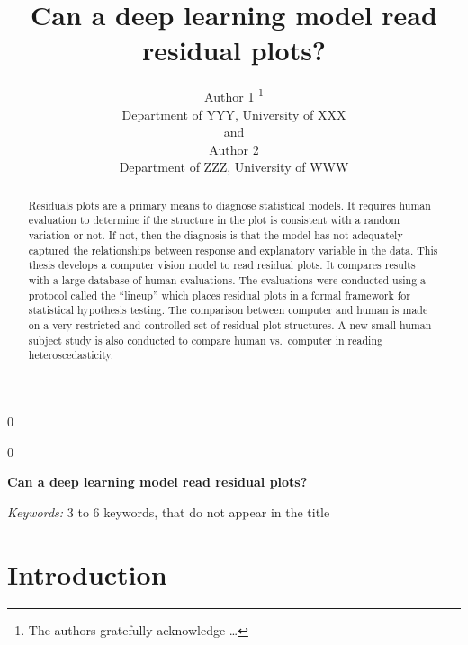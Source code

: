 \documentclass[12pt]{article}
\newcommand{\blind}{0}
\begin{document}
\def\spacingset#1{\renewcommand{\baselinestretch}%
{#1}\small\normalsize} \spacingset{1}



\blind
{
  \title{\bf Can a deep learning model read residual plots?}

  \author{
        Author 1 \thanks{The authors gratefully acknowledge \ldots{}} \\
    Department of YYY, University of XXX\\
     and \\     Author 2 \\
    Department of ZZZ, University of WWW\\
      }
  \maketitle
} \fi

\blind
{
  \bigskip
  \bigskip
  \bigskip
  \begin{center}
    {\LARGE\bf Can a deep learning model read residual plots?}
  \end{center}
  \medskip
} \fi

\bigskip
\begin{abstract}
Residuals plots are a primary means to diagnose statistical models. It
requires human evaluation to determine if the structure in the plot is
consistent with a random variation or not. If not, then the diagnosis is
that the model has not adequately captured the relationships between
response and explanatory variable in the data. This thesis develops a
computer vision model to read residual plots. It compares results with a
large database of human evaluations. The evaluations were conducted
using a protocol called the ``lineup'' which places residual plots in a
formal framework for statistical hypothesis testing. The comparison
between computer and human is made on a very restricted and controlled
set of residual plot structures. A new small human subject study is also
conducted to compare human vs.~computer in reading heteroscedasticity.
\end{abstract}

\noindent%
{\it Keywords:} 3 to 6 keywords, that do not appear in the title
\vfill

\newpage
\spacingset{1.45} %

\section{Introduction}\label{introduction}
\end{document}
